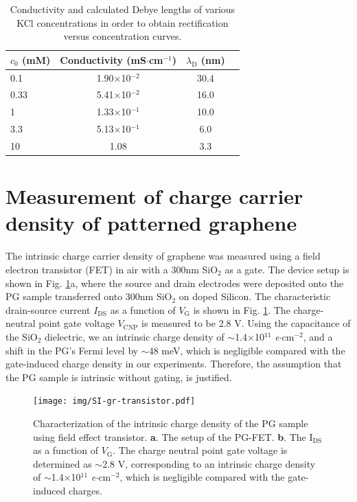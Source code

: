\documentclass[manuscript=suppinfo,email=true, hyperref=true, keywords=false]{achemso}
\newcommand{\Fig}{Fig.}
\begin{document}
\begin{table}[htbp]
  \centering
  \begin{tabular}{lccc}
    \hline
    $c_{0}$ (mM) & Conductivity (mS$\cdot$cm$^{-1}$) & $\lambda_{\mathrm{D}}$ (nm)\\
    \hline
    0.1&        1.90$\times$10$^{-2}$ &        30.4\\
    0.33&       5.41$\times$10$^{-2}$ & 16.0\\
    1   &1.33$\times$10$^{-1}$ & 10.0\\
    3.3&     5.13$\times$10$^{-1}$ &  6.0\\
    10&      1.08    &3.3\\
    \hline
  \end{tabular}
  \caption{Conductivity and calculated Debye lengths of various KCl
    concentrations in order to obtain rectification versus
    concentration curves. }
  \label{tab:debye}
\end{table}

\section{Measurement of charge carrier density of patterned graphene}
\label{sec:charge-dens}
The intrinsic charge carrier density of graphene was measured using a
field electron transistor (FET) in air with a 300nm SiO$_2$ as a
gate. The device setup is shown in \Fig{} \ref{fig:charge-dens}a,
where the source and drain electrodes were deposited onto the PG
sample transferred onto 300nm SiO$_2$ on doped Silicon. The
characteristic drain-source current $I_{\mathrm{DS}}$ as a function of
$V_{\mathrm{G}}$ is shown in \Fig{} \ref{fig:charge-dens}. The
charge-neutral point gate voltage $V_{\mathrm{CNP}}$ is measured to be 2.8 V.
Using the capacitance of the SiO$_{2}$ dielectric, we an intrinsic
charge density of $\sim{}$1.4$\times$10$^{11}$
\textit{e}$\cdot$cm$^{-2}$, and a shift in the PG's Fermi level by
$\sim{}$48 meV, which is negligible compared with the gate-induced
charge density in our experiments. Therefore, the assumption that the
PG sample is intrinsic without gating, is justified.

\begin{figure}[htbp]
  \centering
  \texttt{[image: img/SI-gr-transistor.pdf]}
  \caption{Characterization of the intrinsic charge density of the PG
    sample using field effect transistor. \textbf{a}. The setup of the
    PG-FET. \textbf{b}. The I$_{\mathrm{DS}}$ as a function of
    $V_{\mathrm{G}}$. The charge neutral point gate voltage is
    determined as $\sim{}$2.8 V, corresponding to an intrinsic charge
    density of $\sim{}$1.4$\times$10$^{11}$
    \textit{e}$\cdot$cm$^{-2}$, which is negligible compared with the
    gate-induced charges.}
  \label{fig:charge-dens}
\end{figure}
\end{document}
